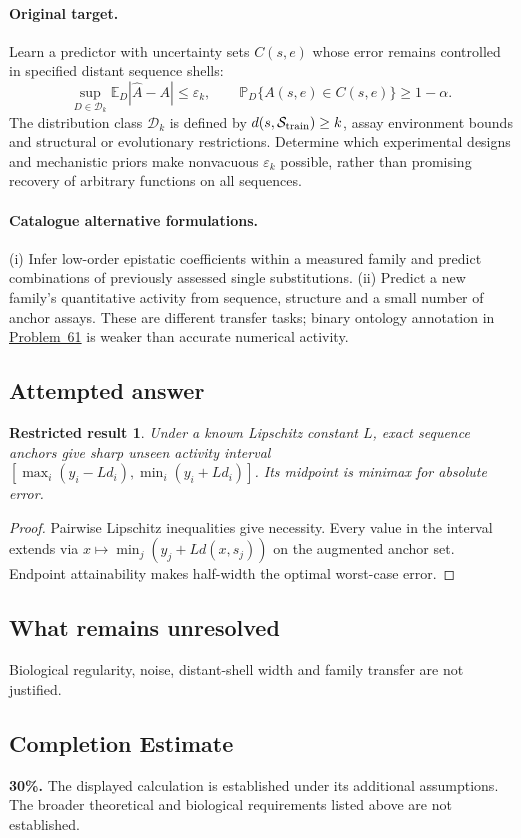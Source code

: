 \documentclass[11pt]{article}
\newcommand{\E}{\mathbb E}
\newcommand{\Prob}{\mathbb P}
\providecommand{\E}{\mathbb E}
\providecommand{\Prob}{\mathbb P}
\newtheorem{attemptresult}{Restricted result}[section]
\begin{document}
\paragraph{Original target.}
Learn a predictor with uncertainty sets $C(s,e)$ whose error remains controlled in specified distant sequence shells:
\[\sup_{D\in\mathcal D_k}\E_D|\widehat A-A|\le\varepsilon_k,\qquad \Prob_D\{A(s,e)\in C(s,e)\}\ge1-\alpha.\]
The distribution class $\mathcal D_k$ is defined by $d(s,\mathcal S_{\rm train})\ge k$, assay environment bounds and structural or evolutionary restrictions. Determine which experimental designs and mechanistic priors make nonvacuous $\varepsilon_k$ possible, rather than promising recovery of arbitrary functions on all sequences.
\paragraph{Catalogue alternative formulations.}
(i) Infer low-order epistatic coefficients within a measured family and predict combinations of previously assessed single substitutions. (ii) Predict a new family's quantitative activity from sequence, structure and a small number of anchor assays. These are different transfer tasks; binary ontology annotation in \href{https://we-solve.github.io/problems/computational-protein-function-prediction-f60af957/}{Problem~61} is weaker than accurate numerical activity.
\subsection{Attempted answer}
\begin{attemptresult}
Under a known Lipschitz constant $L$, exact sequence anchors give sharp unseen activity interval $[\max_i(y_i-Ld_i),\min_i(y_i+Ld_i)]$. Its midpoint is minimax for absolute error.
\end{attemptresult}
\begin{proof}
Pairwise Lipschitz inequalities give necessity. Every value in the interval extends via $x\mapsto\min_j(y_j+Ld(x,s_j))$ on the augmented anchor set. Endpoint attainability makes half-width the optimal worst-case error.
\end{proof}
\subsection{What remains unresolved}
Biological regularity, noise, distant-shell width and family transfer are not justified.
\subsection{Completion Estimate}
\textbf{30\%.} The displayed calculation is established under its additional assumptions. The broader theoretical and biological requirements listed above are not established.
\end{document}
